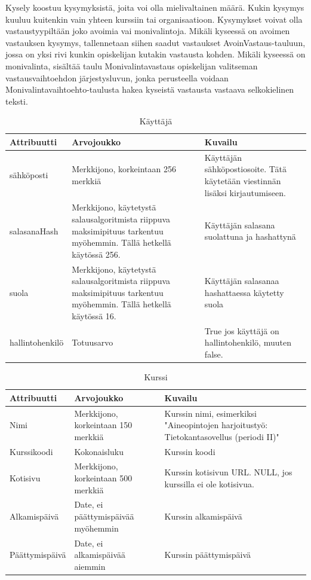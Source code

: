 \documentclass[12pt,a4paper,titlepage]{article}
\begin{document}
Kysely koostuu kysymyksistä, joita voi olla mielivaltainen määrä. Kukin kysymys kuuluu kuitenkin vain yhteen kurssiin tai organisaatioon. Kysymykset voivat olla vastaustyypiltään joko avoimia vai monivalintoja. Mikäli kyseessä on avoimen vastauksen kysymys, tallennetaan siihen saadut vastaukset AvoinVastaus-tauluun, jossa on yksi rivi kunkin opiskelijan kutakin vastausta kohden. Mikäli kyseessä on monivalinta, sisältää taulu Monivalintavastaus opiskelijan valitseman vastausvaihtoehdon järjestysluvun, jonka perusteella voidaan Monivalintavaihtoehto-taulusta hakea kyseistä vastausta vastaava selkokielinen teksti.


\begin{table}[h!]
\caption{Käyttäjä} \label{tietokohde_ensimmainen}
\begin{tabularx}{\textwidth}{ | l X X |}
  \hline
  Attribuutti & Arvojoukko & Kuvailu \\
  \hline
  sähköposti & Merkkijono, korkeintaan 256 merkkiä & Käyttäjän sähköpostiosoite. Tätä käytetään viestinnän lisäksi kirjautumiseen. \\
  salasanaHash & Merkkijono, käytetystä salausalgoritmista riippuva maksimipituus tarkentuu myöhemmin. Tällä hetkellä käytössä 256. & Käyttäjän salasana suolattuna ja hashattynä\\
  suola & Merkkijono, käytetystä salausalgoritmista riippuva maksimipituus tarkentuu myöhemmin. Tällä hetkellä käytössä 16. & Käyttäjän salasanaa hashattaessa käytetty suola \\
  hallintohenkilö & Totuusarvo & True jos käyttäjä on hallintohenkilö, muuten false. \\
  \hline
\end{tabularx}
\end{table}

\begin{table}[h!]
\caption{Kurssi}
\begin{tabularx}{\textwidth}{ |  l X X  |}
  \hline
  Attribuutti & Arvojoukko & Kuvailu \\
  \hline
  Nimi & Merkkijono, korkeintaan 150 merkkiä & Kurssin nimi, esimerkiksi "Aineopintojen harjoitustyö: Tietokantasovellus (periodi II)" \\
  Kurssikoodi & Kokonaisluku & Kurssin koodi \\
  Kotisivu & Merkkijono, korkeintaan 500 merkkiä & Kurssin kotisivun URL. NULL, jos kurssilla ei ole kotisivua. \\
  Alkamispäivä & Date, ei päättymispäivää myöhemmin & Kurssin alkamispäivä \\
  Päättymispäivä & Date, ei alkamispäivää aiemmin & Kurssin päättymispäivä \\
  \hline
\end{tabularx}
\end{table}
\end{document}

